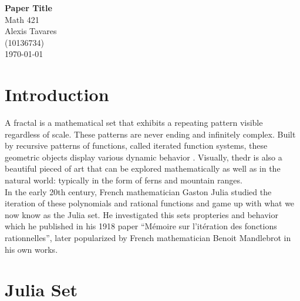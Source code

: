 \documentclass[12pt]{article}
\begin{document}
\begin{titlepage}
\vfill
\centering
{\Huge \bfseries Paper Title}\\[0.4cm]
{\Huge Math 421}\\[1cm]
{\Large Alexis Tavares}\\[0.5cm]
{\Large (10136734)}\\[1cm]
\today
\vfill
\end{titlepage}

\tableofcontents
\newpage
\section{Introduction}
A fractal is a mathematical set that exhibits a repeating pattern visible regardless of scale. These patterns are never ending and infinitely complex. Built by recursive patterns of functions, called iterated function systems, these geometric objects display various dynamic behavior . Visually, thedr is also a beautiful pieced of art that can be explored mathematically as well as in the natural world: typically in the form of ferns and mountain ranges. \\

In the early 20th century, French mathematician Gaston Julia studied the iteration of these polynomials and rational functions and game up with what we now know as the Julia set. He investigated this sets propteries and behavior which he published in his 1918 paper “Mémoire sur l'itération des fonctions rationnelles”,  later popularized by French mathematician Benoit Mandlebrot in his own works. 

\section{Julia Set}
\end{document}
